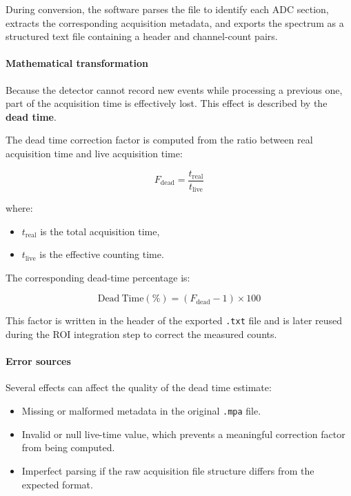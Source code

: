 During conversion, the software parses the file to identify each ADC
section, extracts the corresponding acquisition metadata, and exports
the spectrum as a structured text file containing a header and
channel-count pairs.

\hypertarget{mathematical-transformation}{%
\paragraph{Mathematical
transformation}\label{mathematical-transformation}}

Because the detector cannot record new events while processing a
previous one, part of the acquisition time is effectively lost. This
effect is described by the \textbf{dead time}.

The dead time correction factor is computed from the ratio between real
acquisition time and live acquisition time:

\[
F_{\mathrm{dead}} = \frac{t_{\mathrm{real}}}{t_{\mathrm{live}}}
\]

where:

\begin{itemize}
\tightlist
\item
  \(t_{\mathrm{real}}\) is the total acquisition time,
\item
  \(t_{\mathrm{live}}\) is the effective counting time.
\end{itemize}

The corresponding dead-time percentage is:

\[
\mathrm{Dead\ Time}(\%) = \left(F_{\mathrm{dead}} - 1\right)\times 100
\]

This factor is written in the header of the exported \texttt{.txt} file
and is later reused during the ROI integration step to correct the
measured counts.

\hypertarget{error-sources}{%
\paragraph{Error sources}\label{error-sources}}

Several effects can affect the quality of the dead time estimate:

\begin{itemize}
\tightlist
\item
  Missing or malformed metadata in the original \texttt{.mpa} file.
\item
  Invalid or null live-time value, which prevents a meaningful
  correction factor from being computed.
\item
  Imperfect parsing if the raw acquisition file structure differs from
  the expected format.
\end{itemize}

